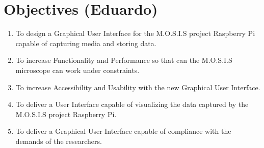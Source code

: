 \section{Objectives (Eduardo)}
\begin{enumerate}
    \item To design a Graphical User Interface for the M.O.S.I.S project Raspberry Pi capable of capturing media and storing data. 
    \item To increase Functionality and Performance so that can the M.O.S.I.S microscope can work under constraints.
    \item To increase Accessibility and Usability with the new Graphical User Interface.
    \item To deliver a User Interface capable of visualizing the data captured by the M.O.S.I.S project Raspberry Pi.
    \item To deliver a Graphical User Interface capable of compliance with the demands of the researchers.
\end{enumerate}